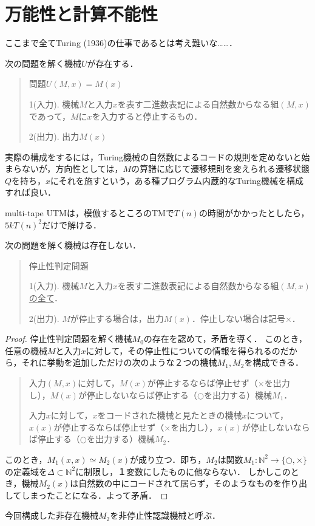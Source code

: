 \documentclass[uplatex, dvipdfmx]{jsreport}
\begin{document}
\section{万能性と計算不能性}
ここまで全てTuring (1936)の仕事であるとは考え難いな……．

\begin{theorem}[UTMの存在]
    次の問題を解く機械$U$が存在する．\cite{Turing-OnComputableNumbers}
    \begin{quotation}
        問題$U(M,x)=M(x)$

        1(入力). 機械$M$と入力$x$を表す二進数表記による自然数からなる組$(M,x)$であって，$M$に$x$を入力すると停止するもの．

        2(出力). 出力$M(x)$
    \end{quotation}
\end{theorem}
実際の構成をするには，Turing機械の自然数によるコードの規則を定めないと始まらないが，方向性としては，$M$の算譜に応じて遷移規則を変えられる遷移状態$Q$を持ち，$x$にそれを施すという，ある種プログラム内蔵的なTuring機械を構成すれば良い．
\begin{remark}
    multi-tape UTMは，模倣するところのTMで$T(n)$の時間がかかったとしたら，$5kT(n)^2$だけで解ける．
\end{remark}

\begin{theorem}[停止性判定機械の非存在]
    次の問題を解く機械は存在しない．
    \begin{quotation}停止性判定問題

        1(入力). 機械$M$と入力$x$を表す二進数表記による自然数からなる組$(M,x)$\underline{の全て}．

        2(出力). $M$が停止する場合は，出力$M(x)$．停止しない場合は記号$\times$．
    \end{quotation}
\end{theorem}
\begin{proof}
    停止性判定問題を解く機械$M_0$の存在を認めて，矛盾を導く．
    このとき，任意の機械$M$と入力$x$に対して，その停止性についての情報を得られるのだから，それに挙動を追加しただけの次のような２つの機械$M_1,M_2$を構成できる．

    \begin{quotation}
        入力$(M,x)$に対して，$M(x)$が停止するならば停止せず（$\times$を出力し），$M(x)$が停止しないならば停止する（$\bigcirc$を出力する）機械$M_1$．

        入力$x$に対して，$x$をコードされた機械と見たときの機械$x$について，$x(x)$が停止するならば停止せず（$\times$を出力し），$x(x)$が停止しないならば停止する（$\bigcirc$を出力する）機械$M_2$．
    \end{quotation}

    このとき，$M_1(x,x)\simeq M_2(x)$が成り立つ．即ち，$M_2$は関数$M_1:\mathbb{N}^2\to\{\bigcirc,\times\}$の定義域を$\Delta\subset\mathbb{N}^2$に制限し，１変数にしたものに他ならない．
    しかしこのとき，機械$M_2(x)$は自然数の中にコードされて居らず，そのようなものを作り出してしまったことになる．よって矛盾．
\end{proof}
\begin{remark}
    今回構成した非存在機械$M_2$を非停止性認識機械と呼ぶ．
\end{remark}
\end{document}
